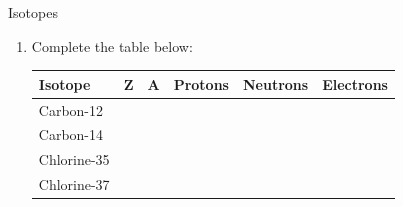 \begin{exercises}  {Isotopes }
\begin{enumerate}[noitemsep, label=\textbf{\arabic*}. ]
\label{m38753*id258452}\begin{enumerate}[noitemsep, label=\textbf{\alph*}. ] 
            \label{m38753*uid65}\item $_{92}^{238}\mathsf{X}$
\label{m38753*uid66}\item $_{90}^{238}\mathsf{X}$
\label{m38753*uid67}\item $_{92}^{235}\mathsf{X}$
\end{enumerate}
            \label{m38753*uid619}\item Complete the table below:
          \begin{center}
\begin{tabular}{|p{2cm}|p{1cm}|p{1cm}|p{1.4cm}|p{1.4cm}|p{1.4cm}|}\hline
\textbf{Isotope} & \textbf{Z} & \textbf{A} & \textbf{Protons} & \textbf{Neutrons} & \textbf{Electrons}\\\hline
Carbon-12 & & & & & \\\hline
Carbon-14 & & & & & \\\hline
Chlorine-35 & & & & & \\\hline
Chlorine-37 & & & & & \\\hline
\end{tabular}
\end{center}


\end{enumerate}
\end{exercises}

